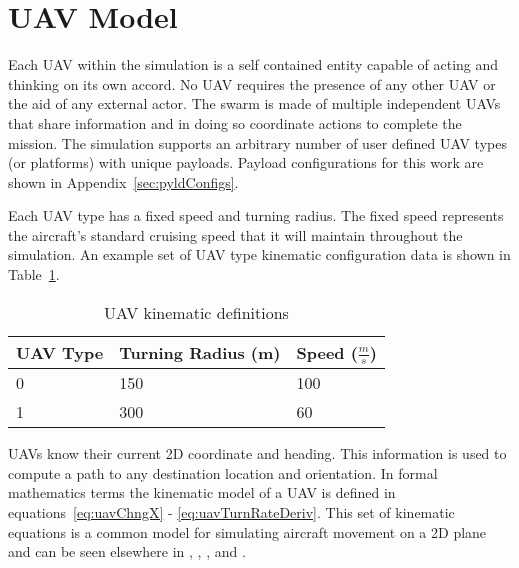 \section{UAV Model}
\label{sec:uav_model}
Each UAV within the simulation is a self contained entity capable of acting and thinking on its own accord.  No UAV requires the presence of any other UAV or the aid of any external actor.  The swarm is made of multiple independent UAVs that share information and in doing so coordinate actions to complete the mission.  The simulation supports an arbitrary number of user defined UAV types (or platforms) with unique payloads.  Payload configurations for this work are shown in Appendix~\ref{sec:pyldConfigs}.


Each UAV type has a fixed speed and turning radius.  The fixed speed represents the aircraft's standard cruising speed that it will maintain throughout the simulation.  An example set of UAV type kinematic configuration data is shown in Table~\ref{tab:uavKinematic}.

\begin{table}[H]
	\caption{UAV kinematic definitions}
	\centering
	\label{tab:uavKinematic}
	\begin{tabular}{|p{1cm}|p{2cm}|p{1cm}|}
		\hline
		UAV Type & Turning Radius (m) & Speed ($\frac{m}{s}$)\\ \hline
		0 & 150 & 100 \\ \hline
		1 & 300 & 60 \\ \hline
	\end{tabular}
\end{table}

UAVs know their current 2D coordinate and heading.  This information is used to compute a path to any destination location and orientation.  In formal mathematics terms the kinematic model of a UAV is defined in equations~\ref{eq:uavChngX} - \ref{eq:uavTurnRateDeriv}.  This set of kinematic equations is a common model for simulating aircraft movement on a 2D plane and can be seen elsewhere in \textcite{beard}, \textcite{finke}, \textcite{mclainBeard}, and \textcite{coopPathBook}.

